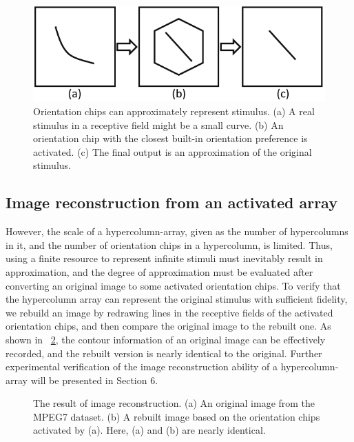 \documentclass[journal]{IEEEtran}
\begin{document}
\begin{figure}[!t]
\centering
\includegraphics[width=0.45\linewidth]{images/fig6.pdf}
\caption{Orientation chips can approximately represent stimulus. 
(a) A real stimulus in a receptive field might be a small curve. 
(b) An orientation chip with the closest built-in orientation preference is activated. 
(c) The final output is an approximation of the original stimulus.}
\label{fig:6}
\end{figure}

\subsection{Image reconstruction from an activated array}

However, the scale of a hypercolumn-array, given as the number of hypercolumns in it, 
and the number of orientation chips in a hypercolumn, is limited. 
Thus, using a finite resource to represent infinite stimuli must inevitably result in approximation, 
and the degree of approximation must be evaluated after converting an original image to some activated orientation chips. 
To verify that the hypercolumn array can represent the original stimulus with sufficient fidelity, 
we rebuild an image by redrawing lines in the receptive fields of the activated orientation chips, 
and then compare the original image to the rebuilt one. 
As shown in \figurename~\ref{fig:7}, 
the contour information of an original image can be effectively recorded, 
and the rebuilt version is nearly identical to the original. 
Further experimental verification of the image reconstruction ability of a hypercolumn-array will be presented in Section 6.

\begin{figure}[!t]
\centering
{}
\hfil
{}
\caption{The result of image reconstruction. (a) An original image from the MPEG7 dataset. (b) A rebuilt image based on the orientation chips activated by (a). Here, (a) and (b) are nearly identical.}
\label{fig:7}
\end{figure}
\end{document}
